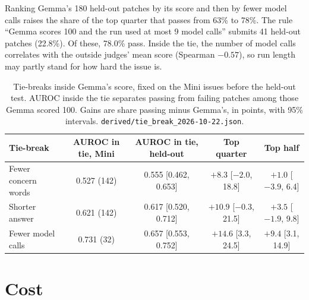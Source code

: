 \documentclass[10pt,letterpaper]{article}
\begin{document}
Ranking Gemma's 180 held-out patches by its score and then by fewer
model calls raises the share of the top quarter that passes from 63\% to 78\%. The rule ``Gemma scores 100 and the
run used at most 9 model calls'' submits 41 held-out patches (22.8\%). Of these, 78.0\% pass. Inside the tie, the
number of model calls correlates with the outside judges' mean score (Spearman $-0.57$), so run length may partly
stand for how hard the issue is.

\begin{table}[H]
\centering
\small
\caption{Tie-breaks inside Gemma's score, fixed on the Mini issues before the held-out test. AUROC inside the tie
separates passing from failing patches among those Gemma scored 100. Gains are share passing minus Gemma's, in
points, with 95\% intervals. \texttt{derived/tie\_break\_2026-10-22.json}.}
\label{tab:tiebreak}
\begin{tabular}{@{}lcccc@{}}
\toprule
Tie-break & AUROC in tie, Mini & AUROC in tie, held-out & Top quarter & Top half \\
\midrule
Fewer concern words & 0.527 (142) & 0.555 [0.462, 0.653] & $+8.3$ [$-2.0$, 18.8] & $+1.0$ [$-3.9$, 6.4] \\
Shorter answer & 0.621 (142) & 0.617 [0.520, 0.712] & $+10.9$ [$-0.3$, 21.5] & $+3.5$ [$-1.9$, 9.8] \\
Fewer model calls & 0.731 (32) & 0.657 [0.553, 0.752] & $+14.6$ [3.3, 24.5] & $+9.4$ [3.1, 14.9] \\
\bottomrule
\end{tabular}
\end{table}

\section{Cost}
\label{app:cost}
\end{document}
